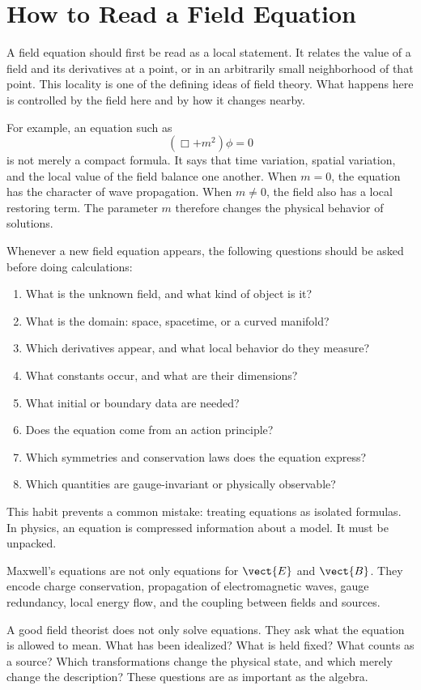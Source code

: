 \section{How to Read a Field Equation}

A field equation should first be read as a local statement. It relates the value
of a field and its derivatives at a point, or in an arbitrarily small
neighborhood of that point. This locality is one of the defining ideas of field
theory. What happens here is controlled by the field here and by how it changes
nearby.

For example, an equation such as
\[
    (\Box+m^2)\phi=0
\]
is not merely a compact formula. It says that time variation, spatial variation,
and the local value of the field balance one another. When \(m=0\), the equation
has the character of wave propagation. When \(m\neq0\), the field also has a
local restoring term. The parameter \(m\) therefore changes the physical behavior
of solutions.

Whenever a new field equation appears, the following questions should be asked
before doing calculations:
\begin{enumerate}
    \item What is the unknown field, and what kind of object is it?
    \item What is the domain: space, spacetime, or a curved manifold?
    \item Which derivatives appear, and what local behavior do they measure?
    \item What constants occur, and what are their dimensions?
    \item What initial or boundary data are needed?
    \item Does the equation come from an action principle?
    \item Which symmetries and conservation laws does the equation express?
    \item Which quantities are gauge-invariant or physically observable?
\end{enumerate}

This habit prevents a common mistake: treating equations as isolated formulas.
In physics, an equation is compressed information about a model. It must be
unpacked.

\begin{examplebox}
Maxwell's equations are not only equations for \(\vect{E}\) and \(\vect{B}\).
They encode charge conservation, propagation of electromagnetic waves, gauge
redundancy, local energy flow, and the coupling between fields and sources.
\end{examplebox}

A good field theorist does not only solve equations. They ask what the equation
is allowed to mean. What has been idealized? What is held fixed? What counts as a
source? Which transformations change the physical state, and which merely change
the description? These questions are as important as the algebra.
